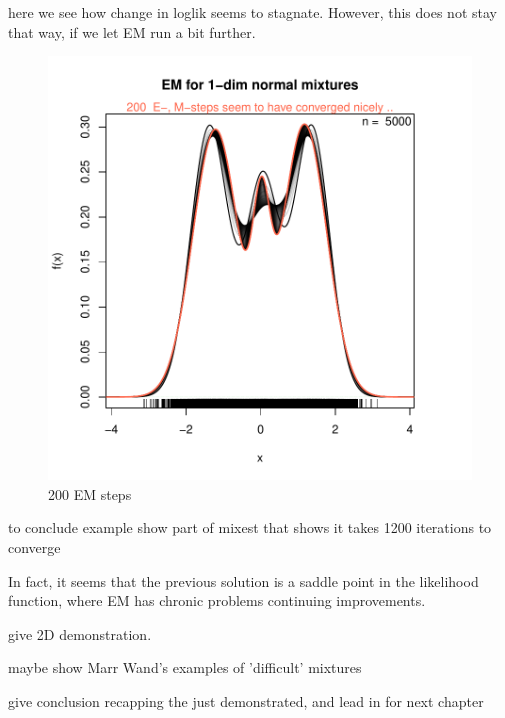
here we see how change in loglik seems to stagnate. However, this does not stay that way, if we let EM run a bit further.


\begin{figure}
\begin{center}
\includegraphics{chapter1-006}
\end{center}
\caption{200 EM steps}
\label{adfafdafds}
\end{figure}

to conclude example show part of mixest that shows it takes 1200 iterations to converge

In fact, it seems that the previous solution is a saddle point in the likelihood function, where EM has chronic problems continuing improvements.

give 2D demonstration.

maybe show Marr Wand's examples of 'difficult' mixtures

give conclusion recapping the just demonstrated, and lead in for next chapter





